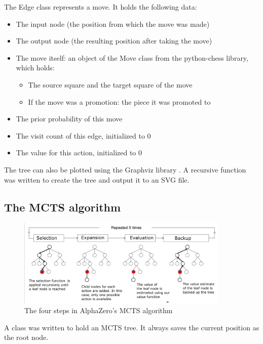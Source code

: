 \documentclass{article}
\begin{document}
The Edge class represents a move. It holds the following data:

\begin{itemize}
    \item The input node (the position from which the move was made)
    \item The output node (the resulting position after taking the move)
    \item The move itself: an object of the Move class from the python-chess library, which holds:
    \begin{itemize}
        \item The source square and the target square of the move
        \item If the move was a promotion: the piece it was promoted to
    \end{itemize}
    \item The prior probability of this move
    \item The visit count of this edge, initialized to 0
    \item The value for this action, initialized to 0
\end{itemize}

The tree can also be plotted using the Graphviz library \cite{Graphviz}. A recursive function was written to 
create the tree and output it to an SVG file. 

\subsection{The MCTS algorithm}


\begin{figure}[H]
    \centering
    \includegraphics[width=0.9\textwidth]{img/mcts-alphazero.png}
    \caption{The four steps in AlphaZero's MCTS algorithm \cite{bodensteinAlphaZero2019}}
\end{figure}

A class was written to hold an MCTS tree. It always saves the current position as the root node.
\end{document}
